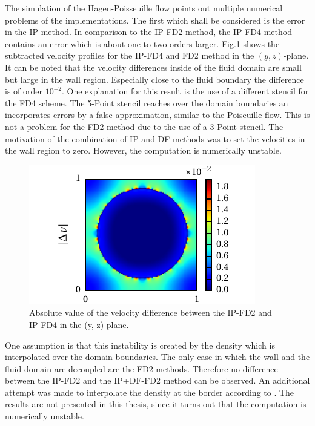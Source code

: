The simulation of the Hagen-Poisseuille flow points out multiple numerical problems of the
implementations.
The first which shall be considered is the error in the IP method.
In comparison to the  IP-FD2 method, the IP-FD4 method contains an error which is about one to two orders larger.
Fig.\ref{valid:hpflow_velodiff_discussion} shows the subtracted velocity profiles for the IP-FD4 and FD2 method in the $(y, z)$-plane.
It can be noted that the velocity differences inside of the fluid domain are small but large in the wall region.
Especially close to the fluid boundary the difference  is of order $10^{-2}$.
One explanation for this result is the use of a different stencil for the FD4 scheme.
The 5-Point stencil reaches over the domain boundaries an incorporates errors by a false approximation, similar to the Poiseuille flow.
This is not a problem for the FD2 method due to the use of a 3-Point stencil.
The motivation of the combination of IP and DF methods was to set the velocities in the wall region to zero.
However, the computation is numerically unstable.
\begin{figure}[!tp]
  \begin{minipage}[c]{0.4\textwidth}
      \centering
      \includegraphics{gfx/immersed_boundary/hpflow/discussion/vzdiff.pdf}
  \end{minipage}
  \begin{minipage}[c]{0.6\textwidth}
      \caption{Absolute value of the velocity difference between the IP-FD2 and IP-FD4 in the (y, z)-plane.
      \label{valid:hpflow_velodiff_discussion}
      }
  \end{minipage}
\end{figure}
One assumption is that this instability is created by the density which is interpolated over the domain boundaries.
The only case in which the wall and the fluid domain are decoupled are the FD2 methods.
Therefore no difference between the IP-FD2 and the IP+DF-FD2 method can be observed.
An additional attempt was made to interpolate the density at the border according to \citep{Gilmanov2003}.
The results are not presented in this thesis, since it turns out that the computation is numerically unstable.

